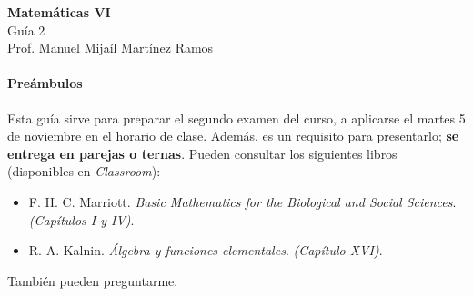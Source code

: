 \documentclass[10pt,a4paper]{article}
\begin{document}
	\begin{center}
				\textbf{Matemáticas VI}\\
				Guía 2 \\
				Prof. Manuel Mijaíl Martínez Ramos
				\bigskip
	\end{center}
	
\paragraph*{Preámbulos} Esta guía sirve para preparar el segundo examen del curso, a aplicarse el martes 5 de noviembre en el horario de clase. Además, es un requisito para presentarlo; \textbf{se entrega en parejas o ternas}.
Pueden consultar los siguientes libros (disponibles en \textit{Classroom}):

	\begin{itemize}
		\item F. H. C. Marriott. \textit{Basic Mathematics for the Biological and Social Sciences}. \textit{(Capítulos I y IV)}.
		\item R. A. Kalnin. \textit{Álgebra y funciones elementales}. \textit{(Capítulo XVI)}.
	\end{itemize}
También pueden preguntarme.
\end{document}

